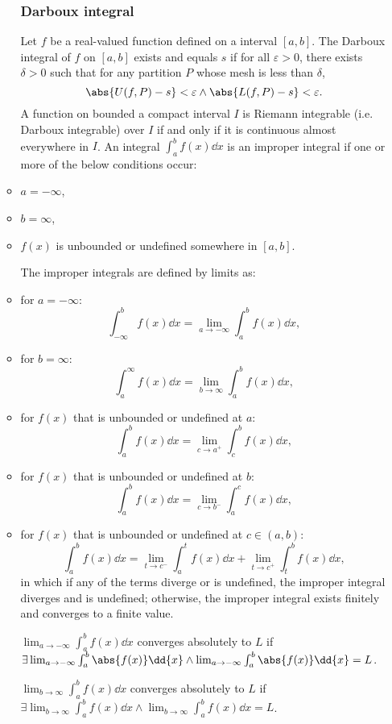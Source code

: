 \documentclass[a4paper,12pt]{report}
\begin{document}
\begin{itemize}
\begin{itemize}
\subsubsection{Darboux integral}
Let $f$ be a real-valued function defined on a interval $[a,b]$. The Darboux integral of $f$ on $[a,b]$ exists and equals $s$ if for all $\varepsilon > 0$, there exists $\delta > 0$ such that for any partition $P$ whose mesh is less than $\delta$,
\[\abs{U(f,P)-s}<\varepsilon \land \abs{L(f,P)-s}<\varepsilon.\]
A function on bounded a compact interval $I$ is Riemann integrable (i.e. Darboux integrable) over $I$ if and only if it is continuous almost everywhere in $I$.
An integral $\int _{a}^{b}f(x)\dd{x}$ is an improper integral if one or more of the below conditions occur:
\ben
\item $a=-\infty$,
\item $b=\infty$,
\item $f(x)$ is unbounded or undefined somewhere in $[a,b]$.
\een

The improper integrals are defined by limits as:
\bit
\item for $a=-\infty$:
\[\int _{-\infty }^bf(x)\dd{x}=\lim _{a\to -\infty }\int _{a}^{b}f(x)\dd{x},\]
\item for $b=\infty$:
\[\int _{a}^{\infty }f(x)\dd{x}=\lim _{b\to \infty }\int _{a}^{b}f(x)\dd{x},\]
\item for $f(x)$ that is unbounded or undefined at $a$:
\[\int_a^bf(x)\dd{x}=\lim_{c\to a^+}\int_c^bf(x)\dd{x},\]
\item for $f(x)$ that is unbounded or undefined at $b$:
\[\int_a^bf(x)\dd{x}=\lim_{c\to b^-}\int_a^cf(x)\dd{x},\]
\item for $f(x)$ that is unbounded or undefined at $c\in(a,b)$:
\[\int _{a}^{b}f(x)\dd{x}=\lim_{t\to c^-}\int _{a}^{t}f(x)\dd{x}+\lim_{t\to c^+}\int _{t}^{b}f(x)\dd{x},\]
\eit
in which if any of the terms diverge or is undefined, the improper integral diverges and is undefined; otherwise, the improper integral exists finitely and converges to a finite value.

$\lim _{a\to -\infty }\int _{a}^{b}f(x)\dd{x}$ converges absolutely to $L$ if $\exists\lim _{a\to -\infty }\int _{a}^{b}\abs{f(x)}\dd{x}\land\lim _{a\to -\infty }\int _{a}^{b}\abs{f(x)}\dd{x}=L$.

$\lim _{b\to \infty }\int _{a}^{b}f(x)\dd{x}$ converges absolutely to $L$ if $\exists\lim _{b\to \infty }\int _{a}^{b}f(x)\dd{x}\land\lim _{b\to \infty }\int _{a}^{b}f(x)\dd{x}=L$.


\end{itemize}
\end{itemize}
\end{document}
